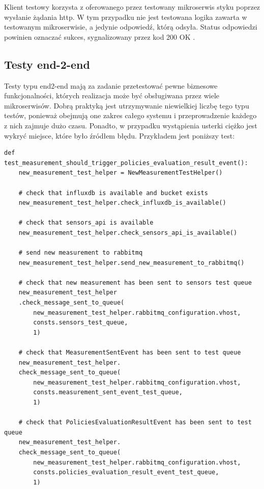\documentclass[11pt, a4]{article} %
\begin{document}
Klient testowy korzysta z oferowanego przez testowany mikroserwis styku poprzez 
wysłanie żądania http. W tym przypadku nie jest testowana logika zawarta w testowanym 
mikroserwisie, a jedynie odpowiedź, którą odsyła. Status odpowiedzi powinien oznaczać 
sukces, sygnalizowany przez kod 200 OK \parencite{fielding:1999ae}.

\subsection{Testy end-2-end}

Testy typu end2-end mają za zadanie przetestować pewne biznesowe 
funkcjonalności, których realizacja może być obsługiwana przez wiele mikroserwisów. 
Dobrą praktyką jest utrzymywanie niewielkiej liczbę tego typu testów, ponieważ 
obejmują one zakres całego systemu i przeprowadzenie każdego z nich zajmuje dużo 
czasu. Ponadto, w przypadku wystąpienia usterki ciężko jest wykryć miejsce, które 
było źródłem błędu.
Przykładem jest poniższy test:

\begin{lstlisting}
def test_measurement_should_trigger_policies_evaluation_result_event():
    new_measurement_test_helper = NewMeasurementTestHelper()

    # check that influxdb is available and bucket exists
    new_measurement_test_helper.check_influxdb_is_available()

    # check that sensors_api is available
    new_measurement_test_helper.check_sensors_api_is_available()

    # send new measurement to rabbitmq
    new_measurement_test_helper.send_new_measurement_to_rabbitmq()

    # check that new measurement has been sent to sensors test queue
    new_measurement_test_helper
    .check_message_sent_to_queue(
        new_measurement_test_helper.rabbitmq_configuration.vhost,
        consts.sensors_test_queue, 
        1)

    # check that MeasurementSentEvent has been sent to test queue  
    new_measurement_test_helper.
    check_message_sent_to_queue(
        new_measurement_test_helper.rabbitmq_configuration.vhost,
        consts.measurement_sent_event_test_queue, 
        1)

    # check that PoliciesEvaluationResultEvent has been sent to test queue
    new_measurement_test_helper.
    check_message_sent_to_queue(
        new_measurement_test_helper.rabbitmq_configuration.vhost,
        consts.policies_evaluation_result_event_test_queue, 
        1)


\end{lstlisting}
\end{document}

